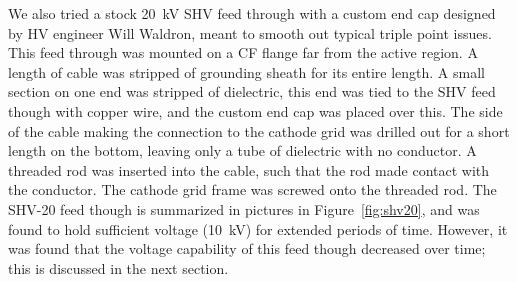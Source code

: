 We also tried a stock 20~kV SHV feed through with a custom end cap designed by \ac{HV} engineer Will Waldron, meant to smooth out typical triple point issues. This feed through was mounted on a CF flange far from the active region. A length of cable was stripped of grounding sheath for its entire length. A small section on one end was stripped of dielectric, this end was tied to the SHV feed though with copper wire, and the custom end cap was placed over this. The side of the cable making the connection to the cathode grid was drilled out for a short length on the bottom, leaving only a tube of dielectric with no conductor. A threaded rod was inserted into the cable, such that the rod made contact with the conductor. The cathode grid frame was screwed onto the threaded rod. The SHV-20 feed though is summarized in pictures in Figure~\ref{fig:shv20}, and was found to hold sufficient voltage (10~kV) for extended periods of time. However, it was found that the voltage capability of this feed though decreased over time; this is discussed in the next section.

